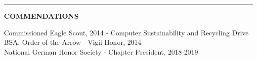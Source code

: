 \documentclass[11pt]{article}
\newcommand{\leftColSize}{0.22}		%
\newcommand{\rightColSize}{0.78}	%
\begin{document}
\textcolor{black!20}{\rule{\textwidth}{3pt}}
\begin{center}
\begin{minipage}[t]{\leftColSize\textwidth}
\textbf{COMMENDATIONS}
\end{minipage}%
\begin{minipage}[t]{\rightColSize\textwidth}
Commissioned Eagle Scout, 2014 - Computer Sustainability and Recycling Drive\vspace{2pt}\\
BSA, Order of the Arrow - Vigil Honor, 2014\\
National German Honor Society - Chapter President, 2018-2019
\end{minipage}
\end{center}
\end{document}
